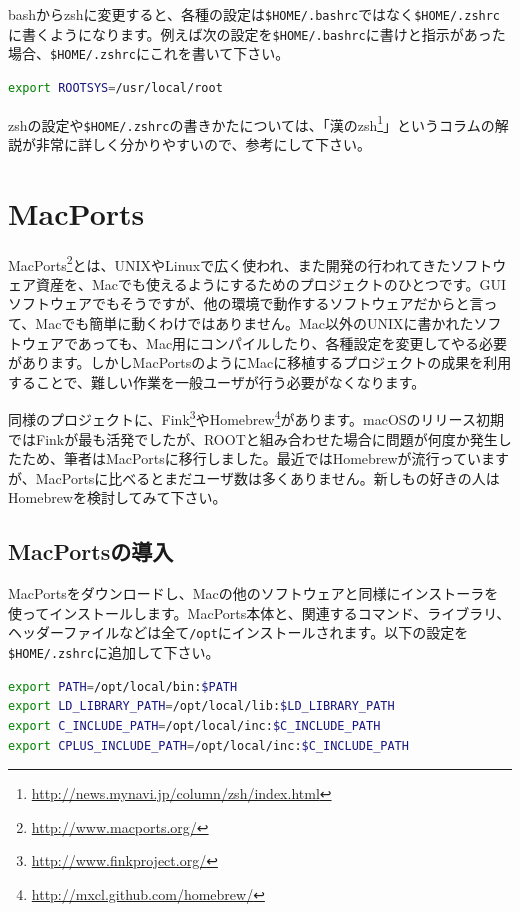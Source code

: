 bashからzshに変更すると、各種の設定は\texttt{\$HOME/.bashrc}ではなく\texttt{\$HOME/.zshrc}に書くようになります。例えば次の設定を\texttt{\$HOME/.bashrc}に書けと指示があった場合、\texttt{\$HOME/.zshrc}にこれを書いて下さい。

\begin{lstlisting}[language=bash]
export ROOTSYS=/usr/local/root
\end{lstlisting}

zshの設定や\texttt{\$HOME/.zshrc}の書きかたについては、「漢のzsh\footnote{\url{http://news.mynavi.jp/column/zsh/index.html}}」というコラムの解説が非常に詳しく分かりやすいので、参考にして下さい。


\section{MacPorts}
\label{sec:MacPorts}
MacPorts\footnote{\url{http://www.macports.org/}}とは、UNIXやLinuxで広く使われ、また開発の行われてきたソフトウェア資産を、Macでも使えるようにするためのプロジェクトのひとつです。GUIソフトウェアでもそうですが、他の環境で動作するソフトウェアだからと言って、Macでも簡単に動くわけではありません。Mac以外のUNIXに書かれたソフトウェアであっても、Mac用にコンパイルしたり、各種設定を変更してやる必要があります。しかしMacPortsのようにMacに移植するプロジェクトの成果を利用することで、難しい作業を一般ユーザが行う必要がなくなります。

同様のプロジェクトに、Fink\footnote{\url{http://www.finkproject.org/}}やHomebrew\footnote{\url{http://mxcl.github.com/homebrew/}}があります。macOSのリリース初期ではFinkが最も活発でしたが、ROOTと組み合わせた場合に問題が何度か発生したため、筆者はMacPortsに移行しました。最近ではHomebrewが流行っていますが、MacPortsに比べるとまだユーザ数は多くありません。新しもの好きの人はHomebrewを検討してみて下さい。

\subsection{MacPortsの導入}

MacPortsをダウンロードし、Macの他のソフトウェアと同様にインストーラを使ってインストールします。MacPorts本体と、関連するコマンド、ライブラリ、ヘッダーファイルなどは全て\texttt{/opt}にインストールされます。以下の設定を\texttt{\$HOME/.zshrc}に追加して下さい。
\begin{lstlisting}[language=bash]
export PATH=/opt/local/bin:$PATH
export LD_LIBRARY_PATH=/opt/local/lib:$LD_LIBRARY_PATH
export C_INCLUDE_PATH=/opt/local/inc:$C_INCLUDE_PATH
export CPLUS_INCLUDE_PATH=/opt/local/inc:$C_INCLUDE_PATH
\end{lstlisting}

